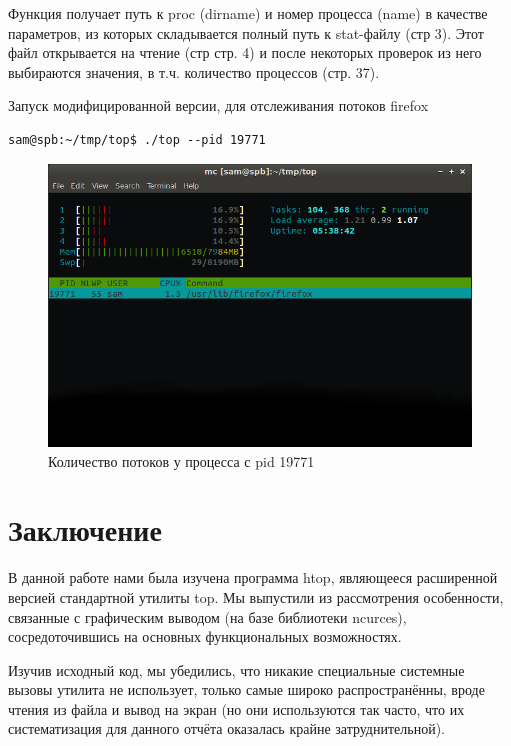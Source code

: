 \documentclass[a4paper, 12pt]{article}		%
\begin{document}


Функция получает путь к proc (dirname) и номер процесса (name) в качестве параметров, из которых складывается полный путь к stat-файлу (стр 3). Этот файл открывается на чтение (стр стр. 4) и после некоторых проверок из него выбираются значения, в т.ч. количество процессов (стр. 37).



Запуск модифицированной версии, для отслеживания потоков firefox
\begin{verbatim}
sam@spb:~/tmp/top$ ./top --pid 19771
\end{verbatim}

\begin{figure}[h!]
\centering
\includegraphics[scale=0.7]{res/NLWP.png}
\caption{Количество потоков у процесса с pid 19771}
\end{figure}

\newpage
\section*{Заключение}

В данной работе нами была изучена программа htop, являющееся расширенной версией стандартной утилиты top. Мы выпустили из рассмотрения особенности, связанные с графическим выводом (на базе библиотеки ncurces), сосредоточившись на основных функциональных возможностях.

Изучив исходный код, мы убедились, что никакие специальные системные вызовы утилита не использует, только самые широко распространённы, вроде чтения из файла и вывод на экран (но они используются так часто, что их систематизация для данного отчёта оказалась крайне затруднительной).
\end{document}
